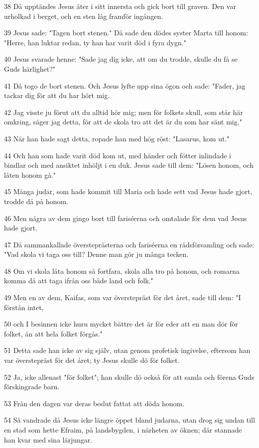 \par 38 Då upptändes Jesus åter i sitt innersta och gick bort till graven. Den var urholkad i berget, och en sten låg framför ingången.
\par 39 Jesus sade: "Tagen bort stenen." Då sade den dödes syster Marta till honom: "Herre, han luktar redan, ty han har varit död i fyra dygn."
\par 40 Jesus svarade henne: "Sade jag dig icke, att om du trodde, skulle du få se Guds härlighet?"
\par 41 Då togo de bort stenen. Och Jesus lyfte upp sina ögon och sade: "Fader, jag tackar dig för att du har hört mig.
\par 42 Jag visste ju förut att du alltid hör mig; men för folkets skull, som står här omkring, säger jag detta, för att de skola tro att det är du som har sänt mig."
\par 43 När han hade sagt detta, ropade han med hög röst: "Lasarus, kom ut."
\par 44 Och han som hade varit död kom ut, med händer och fötter inlindade i bindlar och med ansiktet inhöljt i en duk. Jesus sade till dem: "Lösen honom, och låten honom gå."
\par 45 Många judar, som hade kommit till Maria och hade sett vad Jesus hade gjort, trodde då på honom.
\par 46 Men några av dem gingo bort till fariséerna och omtalade för dem vad Jesus hade gjort.
\par 47 Då sammankallade översteprästerna och fariséerna en rådsförsamling och sade: "Vad skola vi taga oss till? Denne man gör ju många tecken.
\par 48 Om vi skola låta honom så fortfara, skola alla tro på honom, och romarna komma då att taga ifrån oss både land och folk."
\par 49 Men en av dem, Kaifas, som var överstepräst för det året, sade till dem: "I förstån intet,
\par 50 och I besinnen icke huru mycket bättre det är för eder att en man dör för folket, än att hela folket förgås."
\par 51 Detta sade han icke av sig själv, utan genom profetisk ingivelse, eftersom han var överstepräst för det året; ty Jesus skulle dö för folket.
\par 52 Ja, icke allenast "för folket"; han skulle dö också för att samla och förena Guds förskingrade barn.
\par 53 Från den dagen var deras beslut fattat att döda honom.
\par 54 Så vandrade då Jesus icke längre öppet bland judarna, utan drog sig undan till en stad som hette Efraim, på landsbygden, i närheten av öknen; där stannade han kvar med sina lärjungar.
